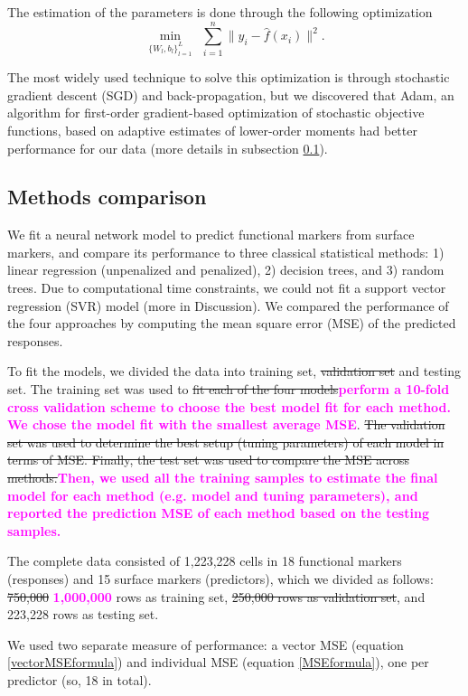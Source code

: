 \documentclass[graybox]{svmult}
\newcommand{\claudia}[2]{\sout{#1}\textcolor{magenta}{\textbf{#2}}}
\begin{document}
The estimation of the parameters is done through the following
optimization
\begin{equation}
\min_{\{W_l,b_l\}_{l=1}^L} \ \ \sum_{i=1}^n \| y_i-\hat{f}(x_i) \|^2.
\end{equation}

The most widely used technique to solve this optimization is through
stochastic gradient descent (SGD) and back-propagation, but we
discovered that Adam\cite{Kingma2014}, an algorithm for first-order
gradient-based optimization of stochastic objective functions, based
on adaptive estimates of lower-order moments had better performance
for our data (more details in subsection \ref{comparison}).


\subsection{Methods comparison}
\label{comparison}

We fit a neural network model to predict functional markers from
surface markers, and compare its performance to three classical
statistical methods: 1) linear regression (unpenalized and penalized),
2) decision trees, and 3) random trees. Due to computational time
constraints, we could not fit a support vector regression (SVR) model
(more in Discussion). We compared the performance of the four
approaches by computing the mean square error (MSE) of the predicted
responses.

To fit the models, we divided the data into training set,
\claudia{validation set}{} and testing set. The training set was used
to \claudia{fit each of the four models}{perform a 10-fold cross
  validation scheme to choose the best model fit for each method. We
  chose the model fit with the smallest average MSE}. \claudia{The
  validation set was used to determine the best setup (tuning
  parameters) of each model in terms of MSE. Finally, the test set was
  used to compare the MSE across methods.}{Then, we used all the
  training samples to estimate the final model for each method
  (e.g. model and tuning parameters), and reported the prediction MSE
  of each method based on the testing samples.}

The complete data consisted of 1,223,228 cells in 18 functional
markers (responses) and 15 surface markers (predictors), which we
divided as follows: \claudia{750,000}{ 1,000,000} rows as training set,
\claudia{250,000 rows as validation set}{}, and 223,228 rows as
testing set.

We used two separate measure of performance: a vector MSE (equation
\ref{vectorMSEformula}) and individual MSE (equation
\ref{MSEformula}), one per predictor (so, 18 in total).
\end{document}
